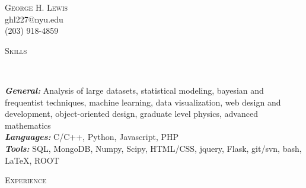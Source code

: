 \documentclass[9pt]{article}
\newenvironment{changemargin}[2]{%
  \begin{list}{}{%
    \setlength{\topsep}{0pt}%
    \setlength{\leftmargin}{#1}%
    \setlength{\rightmargin}{#2}%
    \setlength{\listparindent}{\parindent}%
    \setlength{\itemindent}{\parindent}%
    \setlength{\parsep}{\parskip}%
  }%
  \item[]}{\end{list}
}
\newcommand{\lineover}{
	\begin{changemargin}{-0.05in}{-0.05in}
		\vspace*{-8pt}
		\hrulefill \\
		\vspace*{-2pt}
	\end{changemargin}
}
\newcommand{\header}[1]{
	\begin{changemargin}{-0.5in}{-0.5in}
		\scshape{#1}\\
  	\lineover
	\end{changemargin}
}
\newcommand{\contact}[4]{
	\begin{changemargin}{-0.5in}{-0.5in}
		\begin{center}
			{\Large \scshape {#1}}\\ \smallskip
			{#2}\\ \smallskip 
			{#3}\\ \smallskip
			{#4}\smallskip
		\end{center}
	\end{changemargin}
}
\newenvironment{body} {
	\vspace*{-16pt}
	\begin{changemargin}{-0.25in}{-0.5in}
  }	
	{\end{changemargin}
}
\begin{document}
\contact{George H. Lewis}{ghl227@nyu.edu}{(203) 918-4859}
\smallskip

\smallskip

\header{Skills}
\begin{body}
	\vspace{14pt}
        \emph{\textbf{General:}}{} Analysis of large datasets, statistical modeling, bayesian and frequentist techniques, machine learning, data visualization, web design and development, object-oriented design, graduate level physics, advanced mathematics \\
        \smallskip
	\emph{\textbf{Languages:}}{} C/C++, Python, Javascript, PHP \\
        \smallskip
        \emph{\textbf{Tools:}}{} SQL, MongoDB, Numpy, Scipy, HTML/CSS, jquery, Flask, git/svn, bash, \LaTeX{}, ROOT \\
\end{body}

\smallskip

\header{Experience}
\end{document}
